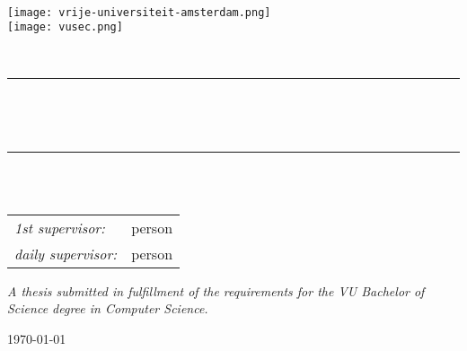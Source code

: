 \begin{titlepage}
    \newcommand{\HRule}{\rule{0.8\linewidth}{0.2mm}}

    \centering

    \vspace*{1em}
    \textsc{\large \theinstitution}\\[1em]

    \texttt{[image: vrije-universiteit-amsterdam.png]} \\[2em]
    \texttt{[image: vusec.png]}

    \vspace{4em}
    \textsc{\Large \thesubject}\\
    \vspace{4em}

    \HRule\\[0.7cm]

    \begin{minipage}{0.75\textwidth}
      \centering
      \setlength{\baselineskip}{2em}
      {\LARGE\bfseries \thetitle}\\[1em]
      \vspace{1em}
    \end{minipage}

    \HRule\\[1.5cm]

    {\Large \theauthor}\\
    \vspace{2em}
    \begin{minipage}{0.7\textwidth}
      \large
      \centering
      \begin{tabular}{ l l }
        \textit{1st supervisor:}      & person\\
        \textit{daily supervisor:}    & person\\
      \end{tabular}
    \end{minipage}

    \vfill
    \begin{minipage}{0.8\textwidth}
      \centering
      \textit{\large
        A thesis submitted in fulfillment of the requirements for the VU Bachelor of Science degree in Computer Science.
      }
    \end{minipage}

    \vspace{2em}
    {\large\today}

    \vspace{4em}
\end{titlepage}
